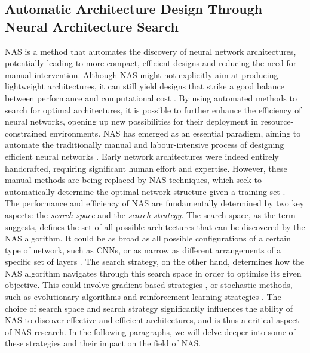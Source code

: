 
\subsection{Automatic Architecture Design Through Neural Architecture Search}
\label{sec:sota:nas} 

\acf{NAS} is a method that automates the discovery of neural network
architectures, potentially leading to more compact, efficient designs and
reducing the need for manual intervention. Although \ac{NAS} might not
explicitly aim at producing lightweight architectures, it can still yield
designs that strike a good balance between performance and computational cost
\cite{DBLP:conf/cvpr/TanCPVSHL19,DBLP:conf/icml/TanL19}. By using automated
methods to search for optimal architectures, it is possible to further enhance
the efficiency of neural networks, opening up new possibilities for their
deployment in resource-constrained environments. \ac{NAS} has emerged as an
essential paradigm, aiming to automate the traditionally manual and
labour-intensive process of designing efficient neural networks
\cite{DBLP:journals/corr/MiikkulainenLMR17}. Early network architectures were
indeed entirely handcrafted, requiring significant human effort and expertise.
However, these manual methods are being replaced by \ac{NAS} techniques, which
seek to automatically determine the optimal network structure given a training
set \cite{DBLP:journals/corr/abs-2301-08727,elsken2019neural}.\\

The performance and efficiency of \ac{NAS} are fundamentally determined by two
key aspects: the \emph{search space} and the \emph{search strategy}. The search
space, as the term suggests, defines the set of all possible architectures that
can be discovered by the \ac{NAS} algorithm. It could be as broad as all
possible configurations of a certain type of network, such as \acp{CNN}, or as
narrow as different arrangements of a specific set of layers
\cite{DBLP:conf/cvpr/LiuCSAHY019}. The search strategy, on the other hand,
determines how the \ac{NAS} algorithm navigates through this search space in
order to optimise its given objective. This could involve gradient-based
strategies \cite{DBLP:conf/iclr/LiuSY19,DBLP:conf/iclr/XuX0CQ0X20}, or
stochastic methods, such as evolutionary algorithms and reinforcement learning
strategies \cite{DBLP:conf/iclr/ZophL17,DBLP:conf/icml/RealMSSSTLK17}. The
choice of search space and search strategy significantly influences the ability
of \ac{NAS} to discover effective and efficient architectures, and is thus a
critical aspect of NAS research. In the following paragraphs, we will delve
deeper into some of these strategies and their impact on the field of
\ac{NAS}.\\



